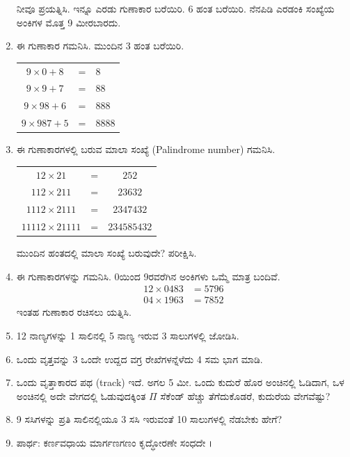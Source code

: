 \begin{enumerate}
ನೀವೂ ಪ್ರಯತ್ನಿಸಿ. ಇನ್ನೂ ಎರಡು ಗುಣಾಕಾರ ಬರೆಯಿರಿ. 6 ಹಂತ ಬರೆಯಿರಿ. ನೆನಪಿಡಿ ಎರಡಂಕಿ ಸಂಖ್ಯೆಯ ಅಂಕಿಗಳ ಮೊತ್ತ  9 ಮೀರಬಾರದು. 

\item ಈ ಗುಣಾಕಾರ ಗಮನಿಸಿ. ಮುಂದಿನ 3 ಹಂತ ಬರೆಯಿರಿ. 

\begin{tabular}[t]{ccl}
$9\times 0 + 8$ & = & $8$\\
$9\times 9 + 7$ & = & $88$\\
$9\times 98 + 6$ & = & $888$\\
$9\times 987 + 5$ & = & $8888$\\
\end{tabular}

\item ಈ ಗುಣಾಕಾರಗಳಲ್ಲಿ ಬರುವ ಮಾಲಾ ಸಂಖ್ಯೆ (Palindrome number) ಗಮನಿಸಿ. 

\begin{tabular}[t]{ccc}
$12\times 21$ & = & $252$\\
$112\times 211$ & = & $23632$\\
$1112\times 2111$ & = & $2347432$\\
$11112\times 21111$ & = & $234585432$\\
\end{tabular}

ಮುಂದಿನ ಹಂತದಲ್ಲಿ ಮಾಲಾ ಸಂಖ್ಯೆ ಬರುವುದೇ? ಪರೀಕ್ಷಿಸಿ. 

\item ಈ ಗುಣಾಕಾರಗಳನ್ನು ಗಮನಿಸಿ. 0ಯಿಂದ 9ರವರೆಗಿನ ಅಂಕಿಗಳು ಒಮ್ಮೆ ಮಾತ್ರ ಬಂದಿವೆ. 
\begin{align*}
12\times 0483 & = 5796\\
04\times 1963 & = 7852
\end{align*}
ಇಂತಹ ಗುಣಾಕಾರ ರಚಿಸಲು ಯತ್ನಿಸಿ. 

\item 12 ನಾಣ್ಯಗಳನ್ನು 1 ಸಾಲಿನಲ್ಲಿ 5 ನಾಣ್ಯ ಇರುವ 3 ಸಾಲುಗಳಲ್ಲಿ ಜೋಡಿಸಿ. 

\item ಒಂದು ವೃತ್ತವನ್ನು 3 ಒಂದೇ ಉದ್ದದ ವಗ್ರ ರೇಖೆಗಳನ್ನೆಳೆದು 4 ಸಮ ಭಾಗ ಮಾಡಿ. 

\item ಒಂದು ವೃತ್ತಾಕಾರದ ಪಥ (track) ಇದೆ. ಅಗಲ 5 ಮೀ. ಒಂದು ಕುದುರೆ ಹೊರ ಅಂಚಿನಲ್ಲಿ ಓಡಿದಾಗ, ಒಳ ಅಂಚಿನಲ್ಲಿ ಅದೇ ವೇಗದಲ್ಲಿ ಓಡುವುದಕ್ಕಿಂತ $\Pi$ ಸೆಕೆಂಡ್ ಹೆಚ್ಚು ತೆಗೆದುಕೊಡರೆ, ಕುದುರೆಯ ವೇಗವೆಷ್ಟು? 

\item 9 ಸಸಿಗಳನ್ನು ಪ್ರತಿ ಸಾಲಿನಲ್ಲಿಯೂ 3 ಸಸಿ ಇರುವಂತೆ 10 ಸಾಲುಗಳಲ್ಲಿ ನೆಡಬೇಕು ಹೇಗೆ? 

\item ಪಾರ್ಥ: ಕರ್ಣವಧಾಯ ಮಾರ್ಗಣಗಣಂ ಕೃದ್ಧೋರಣೇ ಸಂಧದೇ ।


\end{enumerate}

